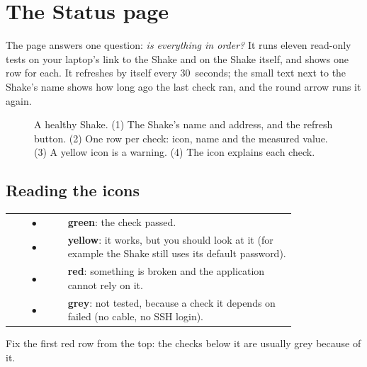 \chapter{The Status page}\label{ch:status}

The  page answers one question: \emph{is everything in order?} It runs eleven read-only tests on your
laptop's link to the Shake and on the Shake itself, and shows one row for each. It refreshes by itself every 30~seconds; the
small text next to the Shake's name shows how long ago the last check ran, and the round arrow runs it again.

\begin{figure}[tbp]
\centering
{}
\caption{A healthy Shake. (1) The Shake's name and address, and the refresh button. (2) One row per check: icon, name and
the measured value. (3) A yellow icon is a warning. (4) The  icon explains each check.}\label{fig:status}
\end{figure}

\section{Reading the icons}
\begin{center}\small
\begin{tabular}{@{}cL{0.8\linewidth}@{}}
\textcolor{rs3dgreen}{\Large$\bullet$} & \textbf{green}: the check passed.\\
\textcolor{rs3damber}{\Large$\bullet$} & \textbf{yellow}: it works, but you should look at it (for example the Shake still uses its default password).\\
\textcolor{rs3dred}{\Large$\bullet$} & \textbf{red}: something is broken and the application cannot rely on it.\\
\textcolor{rs3dgrey}{\Large$\bullet$} & \textbf{grey}: not tested, because a check it depends on failed (no cable, no SSH login).\\
\end{tabular}
\end{center}
Fix the first red row from the top: the checks below it are usually grey because of it.

